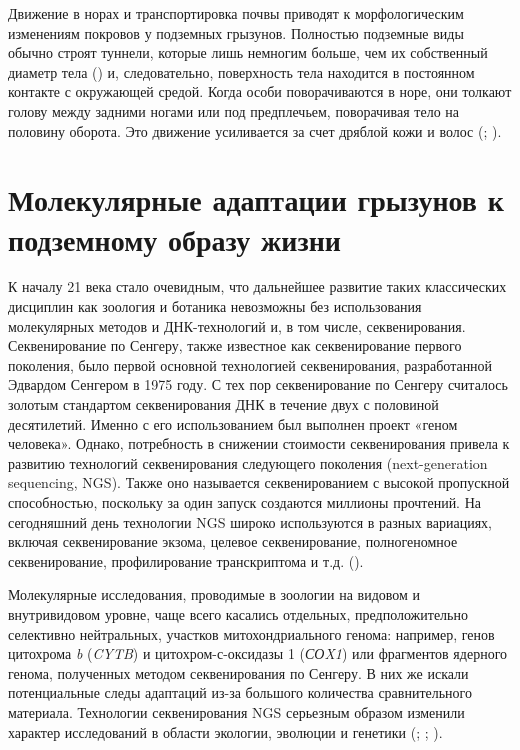 

Движение в норах и транспортировка почвы приводят к морфологическим изменениям покровов у подземных грызунов. Полностью подземные виды обычно строят туннели, которые лишь немногим больше, чем их собственный диаметр тела (\cite{Andersen1982}) и, следовательно, поверхность тела находится в постоянном контакте с окружающей средой. Когда особи поворачиваются в норе, они толкают голову между задними ногами или под предплечьем, поворачивая тело на половину оборота. Это движение усиливается за счет дряблой кожи и волос (\cite{Nevo1979}; \cite{Tucker1981}). 

\section{Молекулярные адаптации грызунов к подземному образу жизни}

К началу 21 века стало очевидным, что дальнейшее развитие таких классических дисциплин как зоология и ботаника невозможны без использования молекулярных методов и  ДНК-технологий и, в том числе, секвенирования. Секвенирование по Сенгеру, также известное как секвенирование первого поколения, было первой основной технологией секвенирования, разработанной Эдвардом Сенгером в 1975 году. С тех пор секвенирование по Сенгеру считалось золотым стандартом секвенирования ДНК в течение двух с половиной десятилетий. Именно с его использованием был выполнен проект «геном человека». Однако, потребность в снижении стоимости секвенирования привела к развитию технологий секвенирования следующего поколения (next-generation sequencing, NGS). Также оно называется секвенированием с высокой пропускной способностью, поскольку за один запуск создаются миллионы прочтений. На сегодняшний день технологии NGS широко используются в разных вариациях, включая секвенирование экзома, целевое секвенирование, полногеномное секвенирование, профилирование транскриптома и т.д. (\cite{Fang2015}).
 
Молекулярные исследования, проводимые в зоологии на видовом и внутривидовом уровне, чаще всего касались отдельных, предположительно селективно нейтральных, участков митохондриального генома: например, генов цитохрома \textit{b} (\textit{CYTB}) и цитохром-с-оксидазы 1 (\textit{СОX1}) или фрагментов ядерного генома, полученных методом секвенирования по Сенгеру. В них же искали потенциальные следы адаптаций из-за большого количества сравнительного материала. Технологии секвенирования NGS серьезным образом изменили характер исследований в области экологии, эволюции и генетики (\cite{Hudson2008}; \cite{Stapley2010}; \cite{Rokas2009}).

